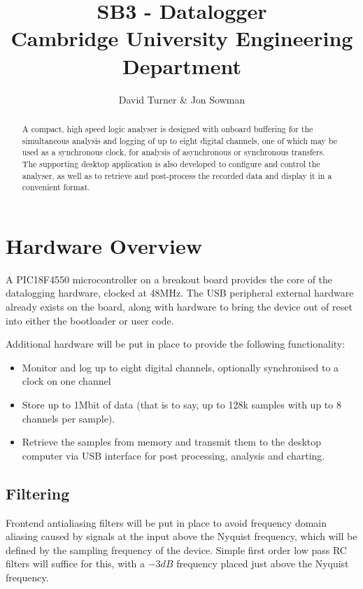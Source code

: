 \documentclass[11pt]{article}
\title{SB3 - Datalogger\\Cambridge University Engineering Department}
\author{David Turner \& Jon Sowman}
\begin{document}
    \maketitle
	
\begin{abstract}
    A compact, high speed logic analyser is designed with onboard buffering for the simultaneous analysis and logging of up to eight digital channels, one of which may be used as a synchronous clock, for analysis of asynchronous or synchronous transfers. The supporting desktop application is also developed to configure and control the analyser, as well as to retrieve and post-process the recorded data and display it in a convenient format.
\end{abstract}

\section{Hardware Overview}
    A PIC18F4550 microcontroller on a breakout board provides the core of the datalogging hardware, clocked at 48MHz. The USB peripheral external hardware already exists on the board, along with hardware to bring the device out of reset into either the bootloader or user code.

    Additional hardware will be put in place to provide the following functionality:
    \begin{itemize}
    \item Monitor and log up to eight digital channels, optionally synchronised to a clock on one channel
    \item Store up to 1Mbit of data (that is to say, up to 128k samples with up to 8 channels per sample).
    \item Retrieve the samples from memory and transmit them to the desktop computer via USB interface for post processing, analysis and charting.
    \end{itemize}

\subsection{Filtering}
    Frontend antialiasing filters will be put in place to avoid frequency domain aliasing caused by signals at the input above the Nyquist frequency, which will be defined by the sampling frequency of the device. Simple first order low pass RC filters will suffice for this, with a $-3dB$ frequency placed just above the Nyquist frequency.
\end{document}
